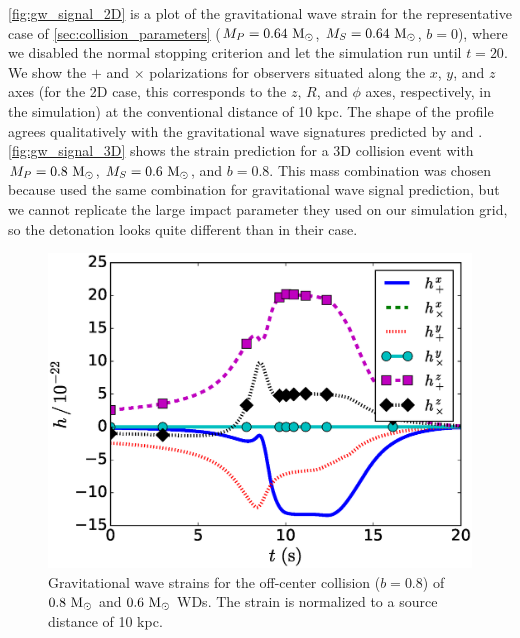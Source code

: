 \documentclass[12pt]{article}
\begin{document}
\autoref{fig:gw_signal_2D} is a plot of the gravitational wave strain for
the representative case of \autoref{sec:collision_parameters} ($M_P = 0.64\ \mathrm{M}_\odot$, $M_S = 0.64\ \mathrm{M}_\odot$, $b = 0$),
where we disabled the normal stopping criterion and let the simulation run until $t = 20$.
We show the $+$ and $\times$ polarizations for observers situated along the $x$, $y$,
and $z$ axes (for the 2D case, this corresponds to the $z$, $R$, and $\phi$ axes, respectively,
in the simulation) at the conventional distance of 10 kpc.
The shape of the profile agrees qualitatively with the gravitational wave signatures
predicted by \cite{loren-aguilar:2009:collisions} and \cite{garcia-senz:2013}.
\autoref{fig:gw_signal_3D} shows the strain prediction for a 3D collision event
with $M_P = 0.8\ \mathrm{M}_\odot$, $M_S = 0.6\ \mathrm{M}_\odot$, and $b = 0.8$. This mass combination
was chosen because \cite{loren-aguilar:2009:collisions} used the same combination for
gravitational wave signal prediction, but we cannot replicate the large impact parameter
they used on our simulation grid, so the detonation looks quite different than in their case.

\begin{figure}
  \centering
  \includegraphics[scale=0.8]{plots/gw_signal_3D}
  \caption[Gravitational wave strain, off-center collision]
          {Gravitational wave strains for the off-center collision ($b = 0.8$) of
           $0.8\ \mathrm{M}_\odot$ and $0.6\ \mathrm{M}_\odot$ WDs. The strain is normalized to a
           source distance of 10 kpc.
           \label{fig:gw_signal_3D}}
\end{figure}
\end{document}
